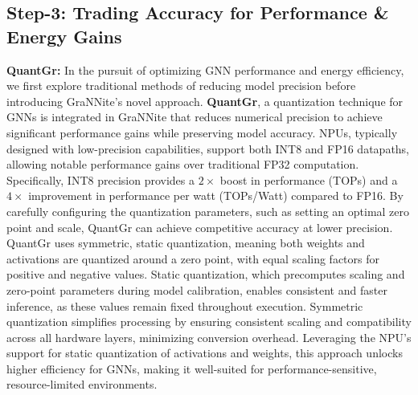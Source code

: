 \subsection{Step-3: Trading Accuracy for Performance \& Energy Gains}
\textbf{QuantGr:} In the pursuit of optimizing GNN performance and energy efficiency, we first explore traditional methods of reducing model precision before introducing GraNNite’s novel approach. \textbf{QuantGr}, a quantization technique for GNNs is integrated in GraNNite that reduces numerical precision to achieve significant performance gains while preserving model accuracy. NPUs, typically designed with low-precision capabilities, support both INT8 and FP16 datapaths, allowing notable performance gains over traditional FP32 computation. Specifically, INT8 precision provides a $2\times$ boost in performance (TOPs) and a $4\times$ improvement in performance per watt (TOPs/Watt) compared to FP16. By carefully configuring the quantization parameters, such as setting an optimal zero point and scale, QuantGr can achieve competitive accuracy at lower precision. QuantGr uses symmetric, static quantization, meaning both weights and activations are quantized around a zero point, with equal scaling factors for positive and negative values. Static quantization, which precomputes scaling and zero-point parameters during model calibration, enables consistent and faster inference, as these values remain fixed throughout execution. Symmetric quantization simplifies processing by ensuring consistent scaling and compatibility across all hardware layers, minimizing conversion overhead. Leveraging the NPU’s support for static quantization of activations and weights, this approach unlocks higher efficiency for GNNs, making it well-suited for performance-sensitive, resource-limited environments.

